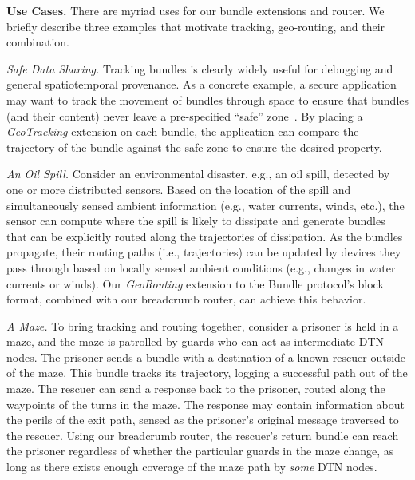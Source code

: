 %
%

{\bf Use Cases.} There are myriad uses for our bundle extensions and
router. We briefly describe three examples that motivate tracking,
geo-routing, and their combination.

{\it Safe Data Sharing.} Tracking bundles is clearly widely useful for
debugging and general spatiotemporal provenance. As a concrete
example, a secure application may want to track the movement of
bundles through space to ensure that bundles (and their content) never
leave a pre-specified ``safe'' zone~\cite{michel12:spatiotemporal}. By
placing a {\em GeoTracking} extension on each bundle, the application
can compare the trajectory of the bundle against the safe zone to
ensure the desired property.

{\it An Oil Spill.} Consider an environmental disaster, e.g., an oil
spill, detected by one or more distributed sensors. Based on the
location of the spill and simultaneously sensed ambient information
(e.g., water currents, winds, etc.), the sensor can compute where the
spill is likely to dissipate and generate bundles that can be
explicitly routed along the trajectories of dissipation. As the
bundles propagate, their routing paths (i.e., trajectories) can be
updated by devices they pass through based on locally sensed ambient
conditions (e.g., changes in water currents or winds). Our {\em
  GeoRouting} extension to the Bundle protocol's block format,
combined with our {\sc breadcrumb} router, can achieve this behavior.

{\it A Maze.} To bring tracking and routing together, consider a
prisoner is held in a maze, and the maze is patrolled by guards who
can act as intermediate DTN nodes. The prisoner sends a bundle with a
destination of a known rescuer outside of the maze. This bundle tracks
its trajectory, logging a successful path out of the maze. The rescuer
can send a response back to the prisoner, routed along the waypoints
of the turns in the maze. The response may contain information about
the perils of the exit path, sensed as the prisoner's original message
traversed to the rescuer. Using our {\sc breadcrumb} router, the
rescuer's return bundle can reach the prisoner regardless of whether
the particular guards in the maze change, as long as there exists
enough coverage of the maze path by {\em some} DTN nodes.






